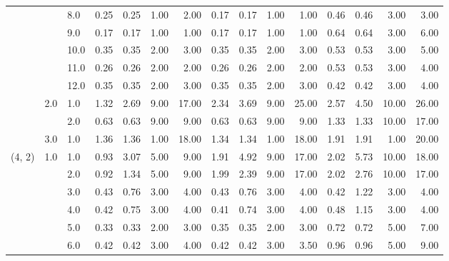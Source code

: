 \begin{tabular}{lllrrrrrrrrrrrr}
       &     & 8.0  &       0.25 &      0.25 & 1.00 &   2.00 &       0.17 &      0.17 &  1.00 &   1.00 &       0.46 &      0.46 &  3.00 &   3.00 \\
       &     & 9.0  &       0.17 &      0.17 & 1.00 &   1.00 &       0.17 &      0.17 &  1.00 &   1.00 &       0.64 &      0.64 &  3.00 &   6.00 \\
       &     & 10.0 &       0.35 &      0.35 & 2.00 &   3.00 &       0.35 &      0.35 &  2.00 &   3.00 &       0.53 &      0.53 &  3.00 &   5.00 \\
       &     & 11.0 &       0.26 &      0.26 & 2.00 &   2.00 &       0.26 &      0.26 &  2.00 &   2.00 &       0.53 &      0.53 &  3.00 &   4.00 \\
       &     & 12.0 &       0.35 &      0.35 & 2.00 &   3.00 &       0.35 &      0.35 &  2.00 &   3.00 &       0.42 &      0.42 &  3.00 &   4.00 \\
       & 2.0 & 1.0  &       1.32 &      2.69 & 9.00 &  17.00 &       2.34 &      3.69 &  9.00 &  25.00 &       2.57 &      4.50 & 10.00 &  26.00 \\
       &     & 2.0  &       0.63 &      0.63 & 9.00 &   9.00 &       0.63 &      0.63 &  9.00 &   9.00 &       1.33 &      1.33 & 10.00 &  17.00 \\
       & 3.0 & 1.0  &       1.36 &      1.36 & 1.00 &  18.00 &       1.34 &      1.34 &  1.00 &  18.00 &       1.91 &      1.91 &  1.00 &  20.00 \\
(4, 2) & 1.0 & 1.0  &       0.93 &      3.07 & 5.00 &   9.00 &       1.91 &      4.92 &  9.00 &  17.00 &       2.02 &      5.73 & 10.00 &  18.00 \\
       &     & 2.0  &       0.92 &      1.34 & 5.00 &   9.00 &       1.99 &      2.39 &  9.00 &  17.00 &       2.02 &      2.76 & 10.00 &  17.00 \\
       &     & 3.0  &       0.43 &      0.76 & 3.00 &   4.00 &       0.43 &      0.76 &  3.00 &   4.00 &       0.42 &      1.22 &  3.00 &   4.00 \\
       &     & 4.0  &       0.42 &      0.75 & 3.00 &   4.00 &       0.41 &      0.74 &  3.00 &   4.00 &       0.48 &      1.15 &  3.00 &   4.00 \\
       &     & 5.0  &       0.33 &      0.33 & 2.00 &   3.00 &       0.35 &      0.35 &  2.00 &   3.00 &       0.72 &      0.72 &  5.00 &   7.00 \\
       &     & 6.0  &       0.42 &      0.42 & 3.00 &   4.00 &       0.42 &      0.42 &  3.00 &   3.50 &       0.96 &      0.96 &  5.00 &   9.00 \\

\end{tabular}
